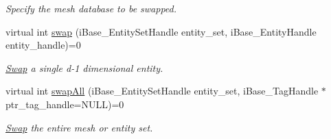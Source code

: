 \begin{DoxyCompactItemize}
\begin{DoxyCompactList}\small\item\em Specify the mesh database to be swapped. \item\end{DoxyCompactList}\item 
virtual int \hyperlink{class_i_t_a_p_s___swap_1_1_swap_adfb444f7ade3254ba8fa9ced2ec15e65}{swap} (iBase\_\-EntitySetHandle entity\_\-set, iBase\_\-EntityHandle entity\_\-handle)=0
\begin{DoxyCompactList}\small\item\em \hyperlink{class_i_t_a_p_s___swap_1_1_swap}{Swap} a single d-\/1 dimensional entity. \item\end{DoxyCompactList}\item 
virtual int \hyperlink{class_i_t_a_p_s___swap_1_1_swap_a8a1fdc1a12fb71dfe28881b10277eafc}{swapAll} (iBase\_\-EntitySetHandle entity\_\-set, iBase\_\-TagHandle $\ast$ptr\_\-tag\_\-handle=NULL)=0
\begin{DoxyCompactList}\small\item\em \hyperlink{class_i_t_a_p_s___swap_1_1_swap}{Swap} the entire mesh or entity set. \item\end{DoxyCompactList}\end{DoxyCompactItemize}
